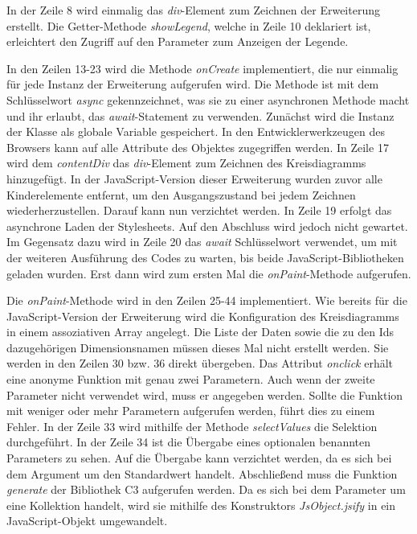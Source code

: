 In der Zeile 8 wird einmalig das \textit{div}-Element zum Zeichnen der Erweiterung erstellt. Die Getter-Methode \textit{showLegend}, welche in Zeile 10 deklariert ist, erleichtert den Zugriff auf den Parameter zum Anzeigen der Legende.

In den Zeilen 13-23 wird die Methode \textit{onCreate} implementiert, die nur einmalig für jede Instanz der Erweiterung aufgerufen wird. Die Methode ist mit dem Schlüssel\-wort \textit{async} gekennzeichnet, was sie zu einer asynchronen Methode macht und ihr erlaubt, das \textit{await}-Statement zu verwenden. Zunächst wird die Instanz der Klasse als globale Variable gespeichert. In den Entwickler\-werkzeugen des Browsers kann auf alle Attribute des Objektes zugegriffen werden. In Zeile 17 wird dem \textit{contentDiv} das \textit{div}-Element zum Zeichnen des Kreis\-diagramms hinzugefügt. In der JavaScript-Version dieser Erweiterung wurden zuvor alle Kinderelemente entfernt, um den Ausgangszustand bei jedem Zeichnen wiederherzustellen. Darauf kann nun verzichtet werden. In Zeile 19 erfolgt das asynchrone Laden der Stylesheets. Auf den Abschluss wird jedoch nicht gewartet. Im Gegensatz dazu wird in Zeile 20 das \textit{await} Schlüssel\-wort verwendet, um mit der weiteren Ausführung des Codes zu warten, bis beide JavaScript-Bibliotheken geladen wurden. Erst dann wird zum ersten Mal die \textit{onPaint}-Methode aufgerufen.

Die \textit{onPaint}-Methode wird in den Zeilen 25-44 implementiert. Wie bereits für die JavaScript-Version der Erweiterung wird die Konfiguration des Kreis\-diagramms in einem assoziativen Array angelegt. Die Liste der Daten sowie die zu den Ids dazugehörigen Dimensionsnamen müssen dieses Mal nicht erstellt werden. Sie werden in den Zeilen 30 bzw. 36 direkt übergeben. Das Attribut \textit{onclick} erhält eine anonyme Funktion mit genau zwei Parametern. Auch wenn der zweite Parameter nicht verwendet wird, muss er angegeben werden. Sollte die Funktion mit weniger oder mehr Parametern aufgerufen werden, führt dies zu einem Fehler. In der Zeile 33 wird mithilfe der Methode \textit{selectValues} die Selektion durchgeführt. In der Zeile 34 ist die Übergabe eines optionalen benannten Parameters zu sehen. Auf die Übergabe kann verzichtet werden, da es sich bei dem Argument um den Standardwert handelt. Abschließend muss die Funktion \textit{generate} der Bibliothek C3 aufgerufen werden. Da es sich bei dem Parameter um eine Kollektion handelt, wird sie mithilfe des Konstruktors \textit{JsObject.jsify} in ein JavaScript-Objekt umgewandelt.


